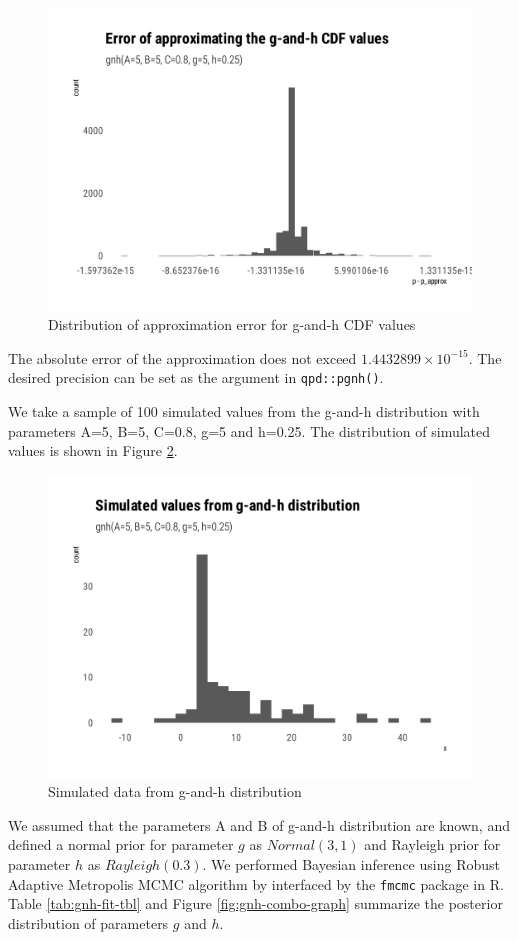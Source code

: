 \documentclass[
  12pt,
]{article}
\begin{document}
\begin{figure}

{\centering \includegraphics[width=0.5\linewidth]{ilbm_article_files/figure-latex/pgnk-error-1} 

}

\caption{Distribution of approximation error for g-and-h CDF values}\label{fig:pgnk-error}
\end{figure}

The absolute error of the approximation does not exceed \ensuremath{1.4432899\times 10^{-15}}. The desired precision can be set as the argument in \texttt{qpd::pgnh()}.

We take a sample of 100 simulated values from the g-and-h distribution with parameters A=5, B=5, C=0.8, g=5 and h=0.25. The distribution of simulated values is shown in Figure \ref{fig:gnh-data}.

\begin{figure}

{\centering \includegraphics[width=0.5\linewidth]{ilbm_article_files/figure-latex/gnh-data-1} 

}

\caption{Simulated data from g-and-h distribution}\label{fig:gnh-data}
\end{figure}

We assumed that the parameters A and B of g-and-h distribution are known, and defined a normal prior for parameter \(g\) as \(Normal(3,1)\) and Rayleigh prior for parameter \(h\) as \(Rayleigh(0.3)\). We performed Bayesian inference using Robust Adaptive Metropolis MCMC algorithm by \citet{vihola2012RobustAdaptiveMetropolis} interfaced by the \texttt{fmcmc} package \citep{vegayon2019FmcmcFriendlyMCMC} in R. Table \ref{tab:gnh-fit-tbl} and Figure \ref{fig:gnh-combo-graph} summarize the posterior distribution of parameters \(g\) and \(h\).
\end{document}

